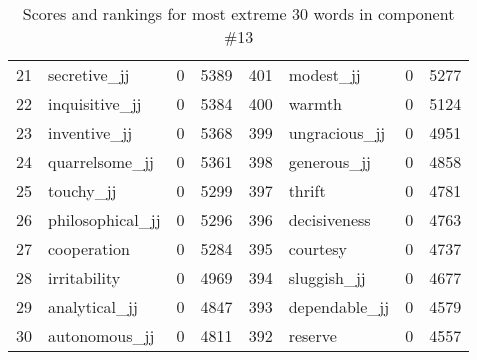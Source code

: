 \begin{table}[tbp]
\begin{tabular}{| rlr@{.}l | rlr@{.}l |}
    21 & secretive\_jj & 0 & 5389    &    401 & modest\_jj & 0 & 5277 \\
    22 & inquisitive\_jj & 0 & 5384    &    400 & warmth & 0 & 5124 \\
    23 & inventive\_jj & 0 & 5368    &    399 & ungracious\_jj & 0 & 4951 \\
    24 & quarrelsome\_jj & 0 & 5361    &    398 & generous\_jj & 0 & 4858 \\
    25 & touchy\_jj & 0 & 5299    &    397 & thrift & 0 & 4781 \\
    26 & philosophical\_jj & 0 & 5296    &    396 & decisiveness & 0 & 4763 \\
    27 & cooperation & 0 & 5284    &    395 & courtesy & 0 & 4737 \\
    28 & irritability & 0 & 4969    &    394 & sluggish\_jj & 0 & 4677 \\
    29 & analytical\_jj & 0 & 4847    &    393 & dependable\_jj & 0 & 4579 \\
    30 & autonomous\_jj & 0 & 4811    &    392 & reserve & 0 & 4557 \\
    \hline
    \end{tabular}
    \caption{Scores and rankings for most extreme 30 words in component \#13} 
\end{table}
\clearpage
